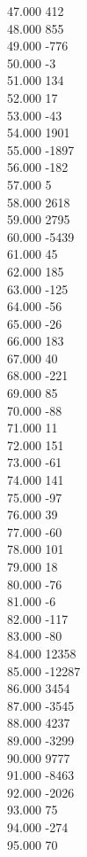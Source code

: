 { 47.000	412 \\
 48.000	855 \\
 49.000	-776 \\
 50.000	-3 \\
 51.000	134 \\
 52.000	17 \\
 53.000	-43 \\
 54.000	1901 \\
 55.000	-1897 \\
 56.000	-182 \\
 57.000	5 \\
 58.000	2618 \\
 59.000	2795 \\
 60.000	-5439 \\
 61.000	45 \\
 62.000	185 \\
 63.000	-125 \\
 64.000	-56 \\
 65.000	-26 \\
 66.000	183 \\
 67.000	40 \\
 68.000	-221 \\
 69.000	85 \\
 70.000	-88 \\
 71.000	11 \\
 72.000	151 \\
 73.000	-61 \\
 74.000	141 \\
 75.000	-97 \\
 76.000	39 \\
 77.000	-60 \\
 78.000	101 \\
 79.000	18 \\
 80.000	-76 \\
 81.000	-6 \\
 82.000	-117 \\
 83.000	-80 \\
 84.000	12358 \\
 85.000	-12287 \\
 86.000	3454 \\
 87.000	-3545 \\
 88.000	4237 \\
 89.000	-3299 \\
 90.000	9777 \\
 91.000	-8463 \\
 92.000	-2026 \\
 93.000	75 \\
 94.000	-274 \\
 95.000	70 \\
}
